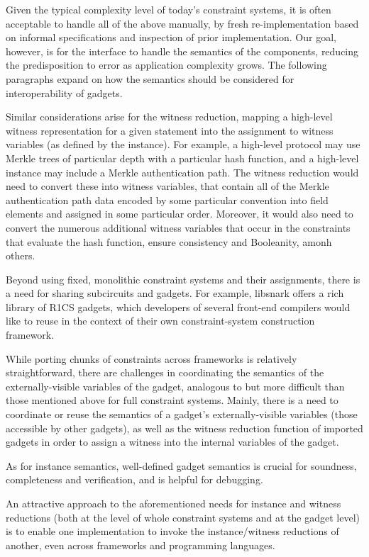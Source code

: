 \documentclass[a4paper,12pt]{article}
\begin{document}
Given the typical complexity level of today’s constraint systems, it is often acceptable to handle all of the above manually, by fresh re-implementation based on informal specifications and inspection of prior implementation. Our goal, however, is for the interface to handle the semantics of the components, reducing the predisposition to error as application complexity grows. The following paragraphs expand on how the semantics should be considered for interoperability of gadgets.

Similar considerations arise for the witness reduction, mapping a high-level witness representation for a given statement into the assignment to witness variables (as defined by the instance). For example, a high-level protocol may use Merkle trees of particular depth with a particular hash function, and a high-level instance may include a Merkle authentication path. The witness reduction would need to convert these into witness variables, that contain all of the Merkle authentication path data encoded by some particular convention into field elements and assigned in some particular order. Moreover, it would also need to convert the numerous additional witness variables that occur in the constraints that evaluate the hash function, ensure consistency and Booleanity, amonh others.

Beyond using fixed, monolithic constraint systems and their assignments, there is a need for sharing subcircuits and gadgets. For example, libsnark offers a rich library of R1CS gadgets, which developers of several front-end compilers would like to reuse in the context of their own constraint-system construction framework. 

While porting chunks of constraints across frameworks is relatively straightforward, there are challenges in coordinating the semantics of the externally-visible variables of the gadget, analogous to but more difficult than those mentioned above for full constraint systems. Mainly, there is a need to coordinate or reuse the semantics of a gadget’s externally-visible variables (those accessible by other gadgets), as well as the witness reduction function of imported gadgets in order to assign a witness into the internal variables of the gadget.

As for instance semantics, well-defined gadget semantics is crucial for soundness, completeness and verification, and is helpful for debugging.

An attractive approach to the aforementioned needs for instance and witness reductions (both at the level of whole constraint systems and at the gadget level) is to enable one implementation to invoke the instance/witness reductions of another, even across frameworks and programming languages.
\end{document}
